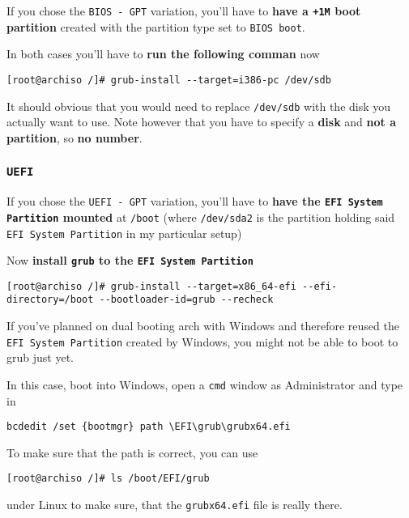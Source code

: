 \documentclass[9pt]{report}
\newenvironment{NOTE}
{\begin{tcolorbox}[colback=admonitionBG,coltitle=draculaFG,colframe=draculaBlue,colbacktitle=draculaBlue,title=NOTE]}
{\end{tcolorbox}}
\newenvironment{IMPORTANT}
{\begin{tcolorbox}[colback=admonitionBG,coltitle=draculaFG,colframe=draculaRed,colbacktitle=draculaRed,title=IMPORTANT]}
{\end{tcolorbox}}
\begin{document}
If you chose the \texttt{BIOS - GPT} variation, you’ll have to \textbf{have a \texttt{+1M} boot partition} created with the partition type set to \texttt{BIOS boot}.


In both cases you’ll have to \textbf{run the following comman} now


\begin{verbatim}
[root@archiso /]# grub-install --target=i386-pc /dev/sdb
\end{verbatim}

\begin{NOTE}
    It should obvious that you would need to replace \texttt{/dev/sdb} with the disk you actually want to use.
    Note however that you have to specify a \textbf{disk} and \textbf{not a partition}, so \textbf{no number}.

\end{NOTE}

\newpage

\hypertarget{x-uefi}{\subsubsection{\texttt{UEFI}}}
If you chose the \texttt{UEFI - GPT} variation, you’ll have to \textbf{have the \texttt{EFI System Partition} mounted} at \texttt{/boot} (where \texttt{/dev/sda2} is the partition holding said \texttt{EFI System Partition} in my particular setup)


Now \textbf{install \texttt{grub} to the \texttt{EFI System Partition}}


\begin{verbatim}
[root@archiso /]# grub-install --target=x86_64-efi --efi-directory=/boot --bootloader-id=grub --recheck
\end{verbatim}

\begin{IMPORTANT}
    If you’ve planned on dual booting arch with Windows and therefore reused the \texttt{EFI System Partition} created by Windows, you might not be able to boot to grub just yet.


    In this case, boot into Windows, open a \texttt{cmd} window as Administrator and type in


    \begin{verbatim}
bcdedit /set {bootmgr} path \EFI\grub\grubx64.efi
    \end{verbatim}

    To make sure that the path is correct, you can use


    \begin{verbatim}
[root@archiso /]# ls /boot/EFI/grub
    \end{verbatim}

    under Linux to make sure, that the \texttt{grubx64.efi} file is really there.

\end{IMPORTANT}
\end{document}
